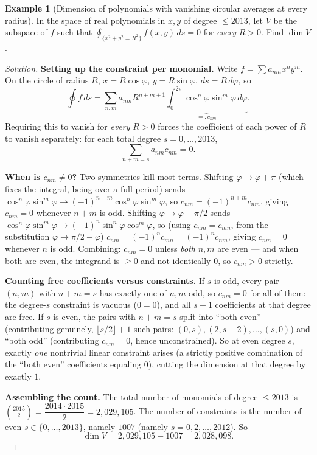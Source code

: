 \documentclass[11pt]{article}
\theoremstyle{definition}
\newtheorem{example}{Example}[section]
\begin{document}
\begin{example}[Dimension of polynomials with vanishing circular averages at every radius]
In the space of real polynomials in $x,y$ of degree $\le2013$, let $V$ be the subspace of $f$ such that $\oint_{\{x^2+y^2=R^2\}}f(x,y)\,ds=0$ for \emph{every} $R>0$. Find $\dim V$.
\end{example}
\begin{proof}[Solution]
\textbf{Setting up the constraint per monomial.} Write $f=\sum a_{nm}x^ny^m$. On the circle of radius $R$, $x=R\cos\varphi$, $y=R\sin\varphi$, $ds=R\,d\varphi$, so
\[
\oint f\,ds=\sum_{n,m}a_{nm}R^{n+m+1}\underbrace{\int_0^{2\pi}\cos^n\varphi\sin^m\varphi\,d\varphi}_{=:c_{nm}}.
\]
Requiring this to vanish for \emph{every} $R>0$ forces the coefficient of each power of $R$ to vanish separately: for each total degree $s=0,\dots,2013$,
\[
\sum_{n+m=s}a_{nm}c_{nm}=0.
\]

\textbf{When is $c_{nm}\ne0$?} Two symmetries kill most terms. Shifting $\varphi\to\varphi+\pi$ (which fixes the integral, being over a full period) sends $\cos^n\varphi\sin^m\varphi\to(-1)^{n+m}\cos^n\varphi\sin^m\varphi$, so $c_{nm}=(-1)^{n+m}c_{nm}$, giving $c_{nm}=0$ whenever $n+m$ is odd. Shifting $\varphi\to\varphi+\pi/2$ sends $\cos^n\varphi\sin^m\varphi\to(-1)^n\sin^n\varphi\cos^m\varphi$, so (using $c_{nm}=c_{mn}$, from the substitution $\varphi\to\pi/2-\varphi$) $c_{nm}=(-1)^nc_{mn}=(-1)^nc_{nm}$, giving $c_{nm}=0$ whenever $n$ is odd. Combining: $c_{nm}=0$ unless \emph{both} $n,m$ are even — and when both are even, the integrand is $\ge0$ and not identically $0$, so $c_{nm}>0$ strictly.

\textbf{Counting free coefficients versus constraints.} If $s$ is odd, every pair $(n,m)$ with $n+m=s$ has exactly one of $n,m$ odd, so $c_{nm}=0$ for all of them: the degree-$s$ constraint is vacuous ($0=0$), and all $s+1$ coefficients at that degree are free. If $s$ is even, the pairs with $n+m=s$ split into ``both even'' (contributing genuinely, $\lfloor s/2\rfloor+1$ such pairs: $(0,s),(2,s-2),\dots,(s,0)$) and ``both odd'' (contributing $c_{nm}=0$, hence unconstrained). So at even degree $s$, exactly \emph{one} nontrivial linear constraint arises (a strictly positive combination of the ``both even'' coefficients equaling $0$), cutting the dimension at that degree by exactly $1$.

\textbf{Assembling the count.} The total number of monomials of degree $\le2013$ is $\binom{2015}2=\dfrac{2014\cdot2015}2=2{,}029{,}105$. The number of constraints is the number of even $s\in\{0,\dots,2013\}$, namely $1007$ (namely $s=0,2,\dots,2012$). So
\[
\dim V=2{,}029{,}105-1007=\boxed{2{,}028{,}098}.
\]
\end{proof}
\end{document}
